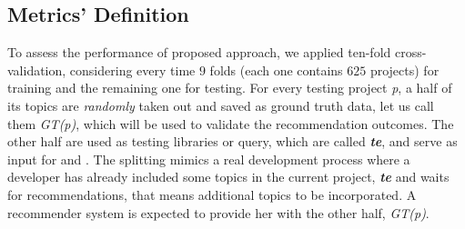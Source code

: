 	\subsection{Metrics’ Definition}\label{sec:methodology-metric}
To assess the performance of \CR proposed approach, we applied ten-fold cross-validation, considering every time $9$ folds (each one contains $625$ projects) for training and the remaining one for testing. 
	For every testing project \emph{p}, a half of its topics are \emph{randomly} 
	taken out and saved as ground truth data, let us call them \emph{GT(p)}, which will be used to validate the recommendation outcomes. The other half are used 
	as testing libraries or query, which are called \emph{\textbf{te}}, and serve 
	as input for  and . %
The splitting mimics a real development process where a 
developer has already included some topics in the current project, \ie 
\emph{\textbf{te}} and waits for recommendations, that means additional topics to be incorporated. A recommender system is expected to provide her 
with the other half, \ie \emph{GT(p)}. %




